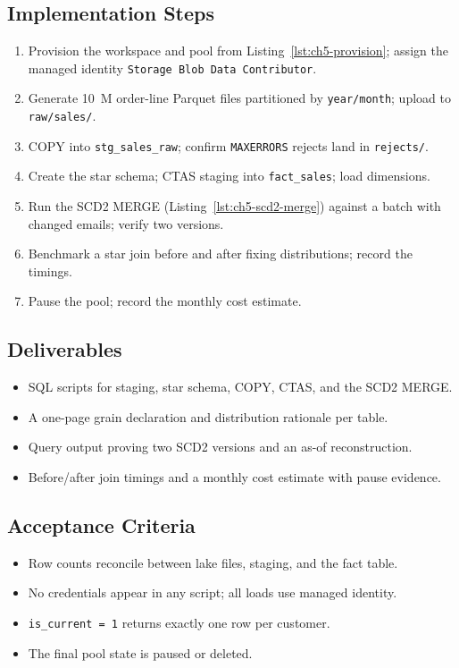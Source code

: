 \subsection*{Implementation Steps}
\begin{enumerate}
    \item Provision the workspace and pool from Listing~\ref{lst:ch5-provision}; assign the managed identity \texttt{Storage Blob Data Contributor}.
    \item Generate 10~M order-line Parquet files partitioned by \texttt{year/month}; upload to \texttt{raw/sales/}.
    \item COPY into \texttt{stg\_sales\_raw}; confirm \texttt{MAXERRORS} rejects land in \texttt{rejects/}.
    \item Create the star schema; CTAS staging into \texttt{fact\_sales}; load dimensions.
    \item Run the SCD2 MERGE (Listing~\ref{lst:ch5-scd2-merge}) against a batch with changed emails; verify two versions.
    \item Benchmark a star join before and after fixing distributions; record the timings.
    \item Pause the pool; record the monthly cost estimate.
\end{enumerate}

\subsection*{Deliverables}
\begin{itemize}
    \item SQL scripts for staging, star schema, COPY, CTAS, and the SCD2 MERGE.
    \item A one-page grain declaration and distribution rationale per table.
    \item Query output proving two SCD2 versions and an as-of reconstruction.
    \item Before/after join timings and a monthly cost estimate with pause evidence.
\end{itemize}

\subsection*{Acceptance Criteria}
\begin{itemize}
    \item Row counts reconcile between lake files, staging, and the fact table.
    \item No credentials appear in any script; all loads use managed identity.
    \item \texttt{is\_current = 1} returns exactly one row per customer.
    \item The final pool state is paused or deleted.
\end{itemize}

